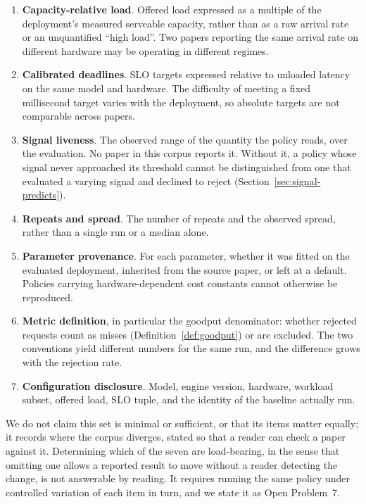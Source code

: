 \documentclass[11pt,letterpaper]{article}
\theoremstyle{definition}
\begin{document}
\begin{enumerate}[leftmargin=1.5em, itemsep=2pt]
\item \textbf{Capacity-relative load}. Offered load expressed as a
      multiple of the deployment's measured serveable capacity, rather
      than as a raw arrival rate or an unquantified ``high load''. Two
      papers reporting the same arrival rate on different hardware may
      be operating in different regimes.
\item \textbf{Calibrated deadlines}. SLO targets expressed relative to
      unloaded latency on the same model and hardware. The difficulty
      of meeting a fixed millisecond target varies with the deployment,
      so absolute targets are not comparable across papers.
\item \textbf{Signal liveness}. The observed range of the quantity the
      policy reads, over the evaluation. No paper in this corpus
      reports it. Without it, a policy whose signal never approached its
      threshold cannot be distinguished from one that evaluated a
      varying signal and declined to reject
      (Section~\ref{sec:signal-predicts}).
\item \textbf{Repeats and spread}. The number of repeats and the
      observed spread, rather than a single run or a median alone.
\item \textbf{Parameter provenance}. For each parameter, whether it was
      fitted on the evaluated deployment, inherited from the source
      paper, or left at a default. Policies carrying hardware-dependent
      cost constants cannot otherwise be reproduced.
\item \textbf{Metric definition}, in particular the goodput
      denominator: whether rejected requests count as misses
      (Definition~\ref{def:goodput}) or are excluded. The two
      conventions yield different numbers for the same run, and the
      difference grows with the rejection rate.
\item \textbf{Configuration disclosure}. Model, engine version,
      hardware, workload subset, offered load, SLO tuple, and the
      identity of the baseline actually run.
\end{enumerate}

We do not claim this set is minimal or sufficient, or that its items
matter equally; it records where the corpus diverges, stated so that a
reader can check a paper against it. Determining which of the seven are
load-bearing, in the sense that omitting one allows a reported result to
move without a reader detecting the change, is not answerable by
reading. It requires running the same policy under controlled variation
of each item in turn, and we state it as Open Problem~7.
\end{document}
